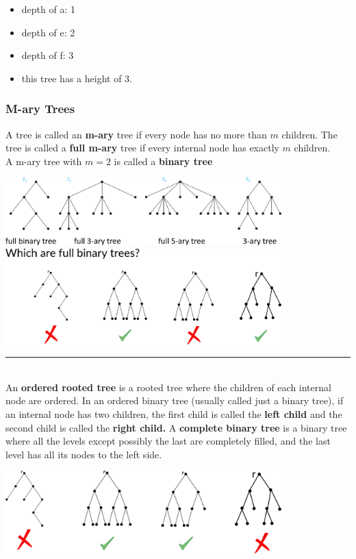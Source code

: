 \documentclass[12pt, letterpaper]{article}
\newcommand{\horizline}[0]{\noindent\rule{\textwidth}{1pt}\\}
\begin{document}
\begin{minipage}[t]{0.35\linewidth}
{\begin{itemize}[leftmargin=1.5cm, label={}]
		\item depth of a: 1
		\item depth of e: 2
		\item depth of f: 3
		\item this tree has a height of 3.
	\end{itemize}}
\end{minipage}

\pagebreak

\subsubsection{M-ary Trees}
A tree is called an \textbf{m-ary} tree if every node has no more than $m$ children. The tree is called a \textbf{full m-ary} tree if every internal node has exactly $m$ children. \\
A m-ary tree with $m=2$ is called a \textbf{binary tree}
\begin{center}
	\includegraphics[width=0.8\textwidth]{mrry.png} \bigbreak
	\includegraphics[width=0.8\textwidth]{bnrytree.png}
\end{center}
\horizline
An \textbf{ordered rooted tree} is a rooted tree where the children of each internal node are ordered.
In an ordered binary tree (usually called just a binary tree), if an internal node has two children, the first child is called the \textbf{left child} and the second child is called the \textbf{right child.} \bigbreak
A \textbf{complete binary tree} is a binary tree where all the levels except possibly the last are completely filled, and the last level has all its nodes to the left side.
\begin{center}
	\includegraphics[width=0.8\textwidth]{bnry2.png} \bigbreak
\end{center}
\end{document}
